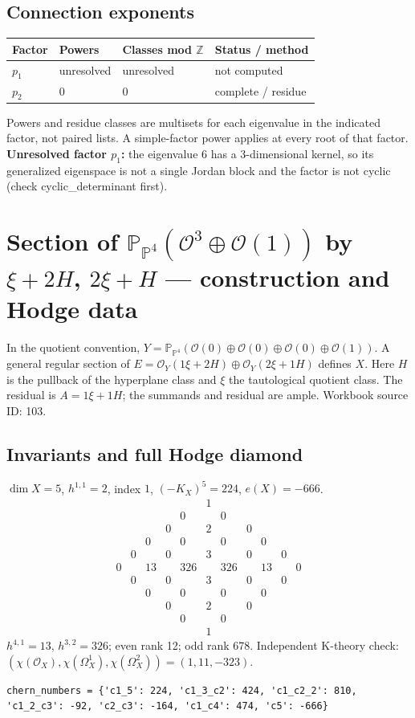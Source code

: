 \documentclass[10pt,a4paper]{article}
\begin{document}
\subsection*{Connection exponents}
\begin{center}\begin{tabular}{llll}\toprule Factor & Powers & Classes mod $\mathbb Z$ & Status / method\\\midrule
$p_{1}$ & unresolved & unresolved & not computed\\
$p_{2}$ & $0$ & $0$ & complete / residue\\
\bottomrule\end{tabular}\end{center}
Powers and residue classes are multisets for each eigenvalue in the indicated factor, not paired lists. A simple-factor power applies at every root of that factor.
\textbf{Unresolved factor $p_{1}$:} the eigenvalue 6 has a 3-dimensional kernel, so its generalized eigenspace is not a single Jordan block and the factor is not cyclic (check cyclic\_determinant first).
\clearpage\section*{Section of $\mathbb P_{\mathbb P^{4}}(\mathcal O^{3}\oplus \mathcal O(1))$ by $\xi +2H$, $2\xi +H$ --- construction and Hodge data}\label{entry:PB5-103}
In the quotient convention, $Y=\mathbb P_{\mathbb P^{4}}(\mathcal O(0)\oplus\mathcal O(0)\oplus\mathcal O(0)\oplus\mathcal O(1))$.
A general regular section of $E=\mathcal O_Y(1\xi+2H)\oplus\mathcal O_Y(2\xi+1H)$ defines $X$.
Here $H$ is the pullback of the hyperplane class and $\xi$ the tautological quotient class. The residual is $A=1\xi+1H$; the summands and residual are ample.
Workbook source ID: 103.
\subsection*{Invariants and full Hodge diamond}
$\dim X=5$, $h^{1,1}=2$, index $1$, $(-K_X)^5=224$, $e(X)=-666$.
\[\begin{array}{ccccccccccc}&&&&&1&&&&&\\&&&&0&&0&&&&\\&&&0&&2&&0&&&\\&&0&&0&&0&&0&&\\&0&&0&&3&&0&&0&\\0&&13&&326&&326&&13&&0\\&0&&0&&3&&0&&0&\\&&0&&0&&0&&0&&\\&&&0&&2&&0&&&\\&&&&0&&0&&&&\\&&&&&1&&&&&\end{array}\]
$h^{4,1}=13$, $h^{3,2}=326$; even rank 12; odd rank 678.
Independent K-theory check: $(\chi(\mathcal O_X),\chi(\Omega_X^1),\chi(\Omega_X^2))=(1, 11, -323)$.
\begin{lstlisting}
chern_numbers = {'c1_5': 224, 'c1_3_c2': 424, 'c1_c2_2': 810, 'c1_2_c3': -92, 'c2_c3': -164, 'c1_c4': 474, 'c5': -666}
\end{lstlisting}
\end{document}
